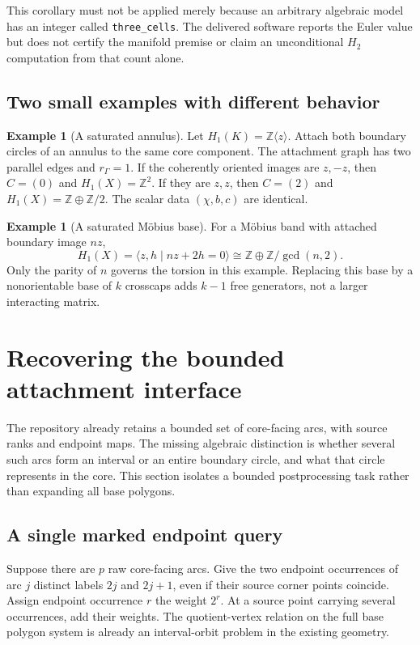 \documentclass[11pt]{article}
\theoremstyle{definition}
\newtheorem{example}[theorem]{Example}
\theoremstyle{remark}
\newcommand{\Z}{\mathbb Z}
\newcommand{\code}[1]{\texttt{#1}}
\begin{document}
This corollary must not be applied merely because an arbitrary algebraic
model has an integer called \code{three\_cells}. The delivered software
reports the Euler value but does not certify the manifold premise or claim
an unconditional $H_2$ computation from that count alone.

\subsection{Two small examples with different behavior}
\begin{example}[A saturated annulus]
Let $H_1(K)=\Z\langle z\rangle$. Attach both boundary circles of an annulus
to the same core component. The attachment graph has two parallel edges and
$r_\Gamma=1$. If the coherently oriented images are $z,-z$, then $C=(0)$
and $H_1(X)=\Z^2$. If they are $z,z$, then $C=(2)$ and
$H_1(X)=\Z\oplus\Z/2$. The scalar data $(\chi,b,c)$ are identical.
\end{example}

\begin{example}[A saturated M\"obius base]
For a M\"obius band with attached boundary image $nz$,
\[
 H_1(X)=\langle z,h\mid nz+2h=0\rangle
 \cong\Z\oplus\Z/\gcd(n,2).
\]
Only the parity of $n$ governs the torsion in this example. Replacing this
base by a nonorientable base of $k$ crosscaps adds $k-1$ free generators,
not a larger interacting matrix.
\end{example}

\section{Recovering the bounded attachment interface}
\label{sec:ports}

The repository already retains a bounded set of core-facing arcs, with
source ranks and endpoint maps. The missing algebraic distinction is whether
several such arcs form an interval or an entire boundary circle, and what
that circle represents in the core. This section isolates a bounded
postprocessing task rather than expanding all base polygons.

\subsection{A single marked endpoint query}
Suppose there are $p$ raw core-facing arcs. Give the two endpoint occurrences
of arc $j$ distinct labels $2j$ and $2j+1$, even if their source corner points
coincide. Assign endpoint occurrence $r$ the weight $2^r$. At a source point
carrying several occurrences, add their weights. The quotient-vertex
relation on the full base polygon system is already an interval-orbit
problem in the existing geometry.
\end{document}
